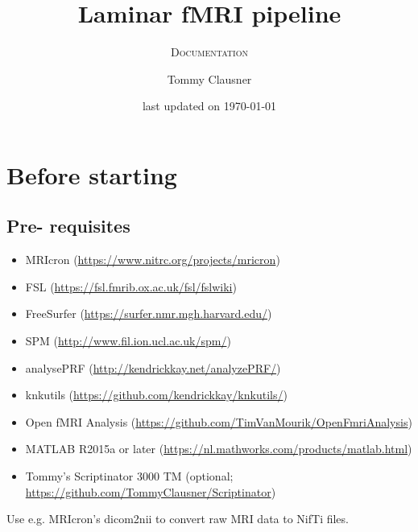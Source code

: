 \documentclass[12pt,a4paper]{scrartcl}
\title{Laminar fMRI pipeline}
\author{Tommy Clausner}
\subtitle{\textsc{Documentation}}
\date{\small{last updated on \today}}
\begin{document}
\begin{titlepage}
\clearpage\maketitle
\thispagestyle{empty}
\end{titlepage}
\tableofcontents
\newpage
\listoffigures
\newpage
\listoftables
\newpage
\section{Before starting}
\subsection{Pre- requisites}
\begin{itemize}
\item MRIcron (\href{https://www.nitrc.org/projects/mricron}{https://www.nitrc.org/projects/mricron})
\item FSL (\href{https://fsl.fmrib.ox.ac.uk/fsl/fslwiki}{https://fsl.fmrib.ox.ac.uk/fsl/fslwiki})
\item FreeSurfer (\href{https://surfer.nmr.mgh.harvard.edu/}{https://surfer.nmr.mgh.harvard.edu/})
\item SPM (\href{http://www.fil.ion.ucl.ac.uk/spm/}{http://www.fil.ion.ucl.ac.uk/spm/})
\item analysePRF (\href{http://kendrickkay.net/analyzePRF/}{http://kendrickkay.net/analyzePRF/})
\item knkutils (\href {https://github.com/kendrickkay/knkutils/}{https://github.com/kendrickkay/knkutils/})
\item Open fMRI Analysis (\href{https://github.com/TimVanMourik/OpenFmriAnalysis}{https://github.com/TimVanMourik/OpenFmriAnalysis})
\item MATLAB R2015a or later (\href{https://nl.mathworks.com/products/matlab.html}{https://nl.mathworks.com/products/matlab.html})
\item Tommy's Scriptinator 3000 TM (optional; \href{https://github.com/TommyClausner/Scriptinator}{https://github.com/TommyClausner/Scriptinator})
\end{itemize}

Use e.g. MRIcron's dicom2nii to convert raw MRI data to NifTi files.\\
\end{document}
